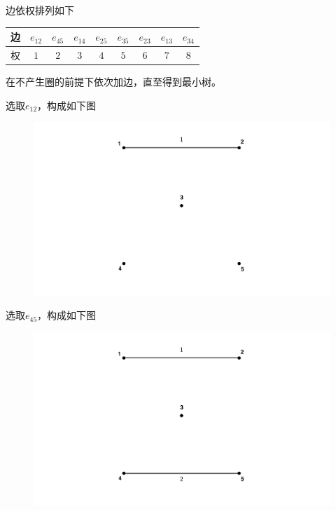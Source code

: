 \documentclass[lang = cn, scheme = chinese, thmcnt = section]{elegantbook}
\begin{document}
\begin{solution}
	边依权排列如下
	\begin{table}[H]
		\centering
		\begin{tabular}{c|cccccccc}
			\hline
			边 & $e_{12}$ & $e_{45}$ & $e_{14}$ & $e_{25}$ & $e_{35}$ & $e_{23}$ & $e_{13}$ & $e_{34}$ \\
			\hline
			权 & $1$ & $2$ & $3$ & $4$ & $5$ & $6$ & $7$ & $8$ \\ \hline
		\end{tabular}
	\end{table}
	在不产生圈的前提下依次加边，直至得到最小树。
	
	选取$e_{12}$，构成如下图
	\begin{figure}[H]
		\centering
		\includegraphics[scale = 0.15]{../图/12.1.2}
	\end{figure}
	
	选取$e_{45}$，构成如下图
	\begin{figure}[H]
		\centering
		\includegraphics[scale = 0.15]{../图/12.1.3}
	\end{figure}
	

\end{solution}
\end{document}
